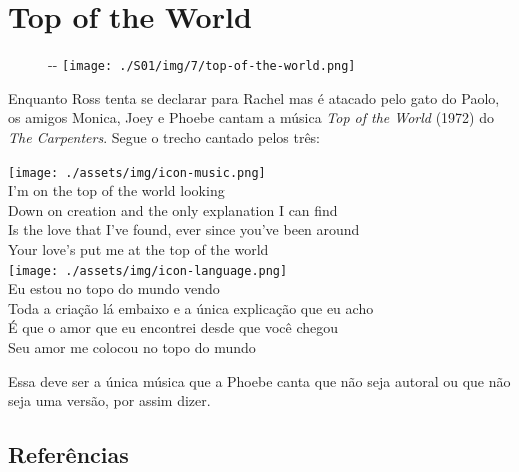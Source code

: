 \hypertarget{top-of-the-world}{%
\section{Top of the World}\label{top-of-the-world}}

\begin{figure}[!ht]
  \begin{adjustwidth}{-\oddsidemargin-1in}{-\rightmargin}
    \centering
    \texttt{[image: ./S01/img/7/top-of-the-world.png]}
  \end{adjustwidth}
\end{figure}

Enquanto Ross tenta se declarar para Rachel mas é atacado pelo gato do
Paolo, os amigos Monica, Joey e Phoebe cantam a música \emph{Top of the
World} (1972) do \emph{The Carpenters}. Segue o trecho cantado pelos
três:

\bigskip
\begin{tcolorbox}[enhanced,
    drop fuzzy shadow southeast, boxrule=0.3pt,
    lower separated=false, sidebyside, sidebyside align=top,
    halign=flush right, halign lower=left,
    colframe=black!30!dialogoBorder,colback=musicaBg]
\texttt{[image: ./assets/img/icon-music.png]}\\
I’m on the top of the world looking\\Down on creation and the only explanation I can find\\Is the love that I’ve found, ever since you’ve been around\\Your love’s put me at the top of the world\\
\tcblower
\texttt{[image: ./assets/img/icon-language.png]}\\
Eu estou no topo do mundo vendo\\Toda a criação lá embaixo e a única explicação que eu acho\\É que o amor que eu encontrei desde que você chegou\\Seu amor me colocou no topo do mundo\\
\end{tcolorbox}

Essa deve ser a única música que a Phoebe canta que não seja autoral ou
que não seja uma versão, por assim dizer.

\hypertarget{referuxeancias-1}{%
\subsection{Referências}\label{referuxeancias-1}}

